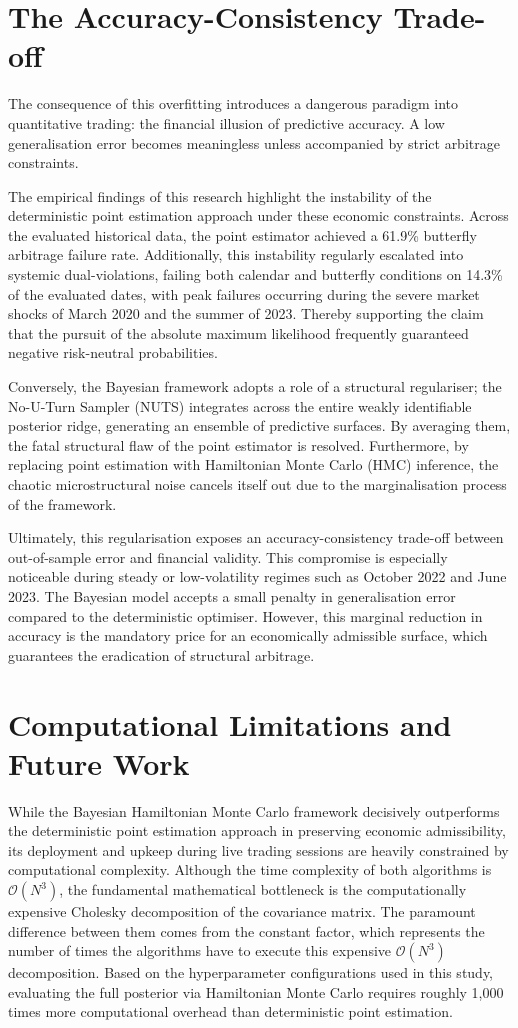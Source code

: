 \documentclass[12pt,oneside]{report}
\theoremstyle{definition}
\theoremstyle{remark}
\begin{document}
\section{The Accuracy-Consistency Trade-off}
The consequence of this overfitting introduces a dangerous paradigm into quantitative trading: the financial illusion of predictive accuracy. A low generalisation error becomes meaningless unless accompanied by strict arbitrage constraints.

The empirical findings of this research highlight the instability of the deterministic point estimation approach under these economic constraints. Across the evaluated historical data, the point estimator achieved a 61.9\% butterfly arbitrage failure rate. Additionally, this instability regularly escalated into systemic dual-violations, failing both calendar and butterfly conditions on 14.3\% of the evaluated dates, with peak failures occurring during the severe market shocks of March 2020 and the summer of 2023. Thereby supporting the claim that the pursuit of the absolute maximum likelihood frequently guaranteed negative risk-neutral probabilities.

Conversely, the Bayesian framework adopts a role of a structural regulariser; the No-U-Turn Sampler (NUTS) integrates across the entire weakly identifiable posterior ridge, generating an ensemble of predictive surfaces. By averaging them, the fatal structural flaw of the point estimator is resolved. Furthermore, by replacing point estimation with Hamiltonian Monte Carlo (HMC) inference, the chaotic microstructural noise cancels itself out due to the marginalisation process of the framework.

Ultimately, this regularisation exposes an accuracy-consistency trade-off between out-of-sample error and financial validity. This compromise is especially noticeable during steady or low-volatility regimes such as October 2022 and June 2023. The Bayesian model accepts a small penalty in generalisation error compared to the deterministic optimiser. However, this marginal reduction in accuracy is the mandatory price for an economically admissible surface, which guarantees the eradication of structural arbitrage.

\section{Computational Limitations and Future Work}
While the Bayesian Hamiltonian Monte Carlo framework decisively outperforms the deterministic point estimation approach in preserving economic admissibility, its deployment and upkeep during live trading sessions are heavily constrained by computational complexity. Although the time complexity of both algorithms is $\mathcal{O}(N^3)$, the fundamental mathematical bottleneck is the computationally expensive Cholesky decomposition of the covariance matrix. The paramount difference between them comes from the constant factor, which represents the number of times the algorithms have to execute this expensive $\mathcal{O}(N^3)$ decomposition. Based on the hyperparameter configurations used in this study, evaluating the full posterior via Hamiltonian Monte Carlo requires roughly 1,000 times more computational overhead than deterministic point estimation.
\end{document}
